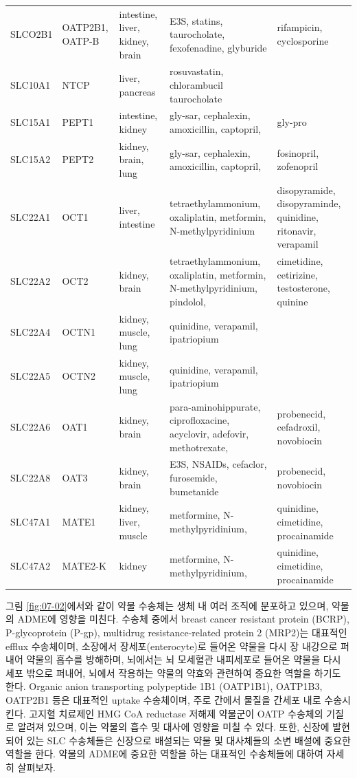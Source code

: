 \documentclass[
  11pt,
  krantz2, a4paper, twoside]{krantz}
\begin{document}
\begin{table}
\begin{tabular}[t]{lllll}
SLCO2B1 & OATP2B1, OATP-B & intestine, liver, kidney, brain & E3S, statins, taurocholate, fexofenadine, glyburide & rifampicin, cyclosporine\\
SLC10A1 & NTCP & liver, pancreas & rosuvastatin, chlorambucil taurocholate & \\
\addlinespace
SLC15A1 & PEPT1 & intestine, kidney & gly-sar, cephalexin, amoxicillin, captopril, & gly-pro\\
SLC15A2 & PEPT2 & kidney, brain, lung & gly-sar, cephalexin, amoxicillin, captopril, & fosinopril, zofenopril\\
SLC22A1 & OCT1 & liver, intestine & tetraethylammonium, oxaliplatin, metformin, N-methylpyridinium & disopyramide, disopyraminde, quinidine, ritonavir, verapamil\\
SLC22A2 & OCT2 & kidney, brain & tetraethylammonium, oxaliplatin, metformin, N-methylpyridinium, pindolol, & cimetidine, cetirizine, testosterone, quinine\\
SLC22A4 & OCTN1 & kidney, muscle, lung & quinidine, verapamil, ipatriopium & \\
\addlinespace
SLC22A5 & OCTN2 & kidney, muscle, lung & quinidine, verapamil, ipatriopium & \\
SLC22A6 & OAT1 & kidney, brain & para-aminohippurate, ciprofloxacine, acyclovir, adefovir, methotrexate, & probenecid, cefadroxil, novobiocin\\
SLC22A8 & OAT3 & kidney, brain & E3S, NSAIDs, cefaclor, furosemide, bumetanide & probenecid, novobiocin\\
SLC47A1 & MATE1 & kidney, liver, muscle & metformine, N-methylpyridinium, & quinidine, cimetidine, procainamide\\
SLC47A2 & MATE2-K & kidney & metformine, N-methylpyridinium, & quinidine, cimetidine, procainamide\\
\bottomrule
\end{tabular}
\end{table}

그림 \ref{fig:07-02}에서와 같이 약물 수송체는 생체 내 여러 조직에 분포하고 있으며,
약물의 ADME에 영향을 미친다. 수송체 중에서 breast cancer resistant
protein (BCRP), P-glycoprotein (P-gp), multidrug resistance-related
protein 2 (MRP2)는 대표적인 efflux 수송체이며, 소장에서
장세포(enterocyte)로 들어온 약물을 다시 장 내강으로 퍼내어 약물의 흡수를
방해하며, 뇌에서는 뇌 모세혈관 내피세포로 들어온 약물을 다시 세포 밖으로
퍼내어, 뇌에서 작용하는 약물의 약효와 관련하여 중요한 역할을 하기도
한다. Organic anion transporting polypeptide 1B1 (OATP1B1), OATP1B3,
OATP2B1 등은 대표적인 uptake 수송체이며, 주로 간에서 물질을 간세포 내로
수송시킨다. 고지혈 치료제인 HMG CoA reductase 저해제 약물군이 OATP
수송체의 기질로 알려져 있으며, 이는 약물의 흡수 및 대사에 영향을 미칠 수
있다. 또한, 신장에 발현되어 있는 SLC 수송체들은 신장으로 배설되는 약물
및 대사체들의 소변 배설에 중요한 역할을 한다. 약물의 ADME에 중요한
역할을 하는 대표적인 수송체들에 대하여 자세히 살펴보자.
\end{document}
